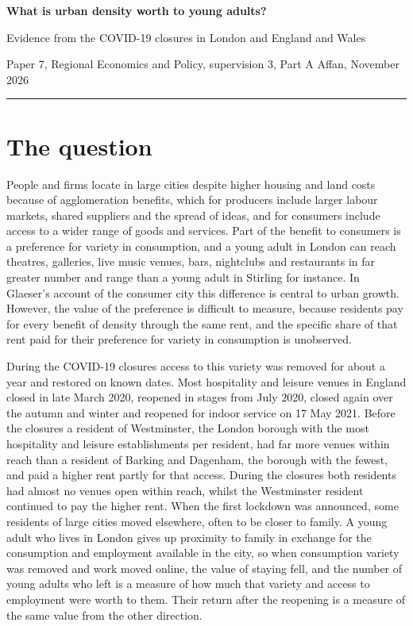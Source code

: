 \documentclass[11pt,a4paper]{article}
\begin{document}
{\Large\bfseries What is urban density worth to young adults?\par}
\vspace{0.2em}
{\large Evidence from the COVID-19 closures in London and England and Wales\par}
\vspace{0.6em}
{\small Paper 7, Regional Economics and Policy, supervision 3, Part A \hfill Affan, November 2026\par}
\vspace{0.3em}
\hrule
\vspace{0.4em}

\section{The question}

People and firms locate in large cities despite higher housing and land costs because of agglomeration benefits, which for producers include larger labour markets, shared suppliers and the spread of ideas, and for consumers include access to a wider range of goods and services. Part of the benefit to consumers is a preference for variety in consumption, and a young adult in London can reach theatres, galleries, live music venues, bars, nightclubs and restaurants in far greater number and range than a young adult in Stirling for instance. In Glaeser's account of the consumer city this difference is central to urban growth. However, the value of the preference is difficult to measure, because residents pay for every benefit of density through the same rent, and the specific share of that rent paid for their preference for variety in consumption is unobserved.

During the COVID-19 closures access to this variety was removed for about a year and restored on known dates. Most hospitality and leisure venues in England closed in late March 2020, reopened in stages from July 2020, closed again over the autumn and winter and reopened for indoor service on 17 May 2021. Before the closures a resident of Westminster, the London borough with the most hospitality and leisure establishments per resident, had far more venues within reach than a resident of Barking and Dagenham, the borough with the fewest, and paid a higher rent partly for that access. During the closures both residents had almost no venues open within reach, whilst the Westminster resident continued to pay the higher rent. When the first lockdown was announced, some residents of large cities moved elsewhere, often to be closer to family. A young adult who lives in London gives up proximity to family in exchange for the consumption and employment available in the city, so when consumption variety was removed and work moved online, the value of staying fell, and the number of young adults who left is a measure of how much that variety and access to employment were worth to them. Their return after the reopening is a measure of the same value from the other direction.
\end{document}
